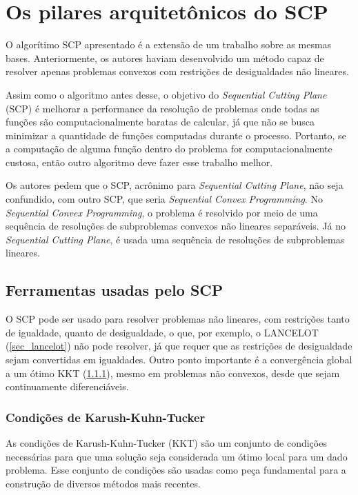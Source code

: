 \section{Os pilares arquitetônicos do SCP}

\noindent
O algorítimo SCP \cite{Still2010} apresentado é a extensão de um trabalho sobre as
mesmas bases. Anteriormente, os autores haviam desenvolvido um método capaz de resolver apenas
problemas convexos com restrições de desigualdades não lineares.

Assim como o algoritmo antes desse, o objetivo do \textit{Sequential Cutting Plane} (SCP) é melhorar
a performance da resolução de problemas onde todas as funções são computacionalmente baratas
de calcular, já que não se busca minimizar a quantidade de funções computadas durante o processo.
Portanto, se a computação de alguma função dentro do problema for computacionalmente custosa, então outro
algoritmo deve fazer esse trabalho melhor.

Os autores pedem que o SCP, acrônimo para \textit{Sequential Cutting Plane}, não seja confundido, com
outro SCP, que seria \textit{Sequential Convex Programming}. No \textit{Sequential Convex Programming}, o problema é
resolvido por meio de uma sequência de resoluções de subproblemas convexos não lineares
separáveis. Já no \textit{Sequential Cutting Plane}, é usada uma sequência de resoluções de subproblemas
lineares.

\subsection{Ferramentas usadas pelo SCP}

\noindent
O SCP \cite{Still2010} pode ser usado para resolver problemas não lineares, com restrições tanto
de igualdade, quanto de desigualdade, o que, por exemplo, o LANCELOT (\ref{sec_lancelot}) não pode
resolver, já que requer que as restrições de desigualdade sejam convertidas em igualdades. Outro
ponto importante é a convergência global a um ótimo KKT (\ref{sec_kkt}), mesmo em problemas não convexos, desde
que sejam continuamente diferenciáveis.

\subsubsection{Condições de Karush-Kuhn-Tucker}
\label{sec_kkt}

\noindent
As condições de Karush-Kuhn-Tucker (KKT) são um conjunto de condições necessárias para
que uma solução seja considerada um ótimo local para um dado problema. Esse conjunto
de condições são usadas como peça fundamental para a construção de diversos métodos mais
recentes.

